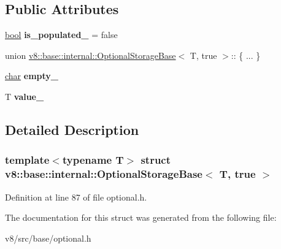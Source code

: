 \subsection*{Public Attributes}
\begin{DoxyCompactItemize}
\item 
\mbox{\label{structv8_1_1base_1_1internal_1_1OptionalStorageBase_3_01T_00_01true_01_4_a451d26301bf5afca988e47872e70180c}} 
\mbox{\hyperlink{classbool}{bool}} {\bfseries is\+\_\+populated\+\_\+} = false
\item 
\mbox{\label{structv8_1_1base_1_1internal_1_1OptionalStorageBase_3_01T_00_01true_01_4_a92e88dd2332f5bc0838d2665e460205b}} 
union \mbox{\hyperlink{structv8_1_1base_1_1internal_1_1OptionalStorageBase}{v8\+::base\+::internal\+::\+Optional\+Storage\+Base}}$<$ T, true $>$\+:: \{ ... \}  
\item 
\mbox{\label{structv8_1_1base_1_1internal_1_1OptionalStorageBase_3_01T_00_01true_01_4_a3a45e93590fd71b94b5c4e20f5f3f6d0}} 
\mbox{\hyperlink{classchar}{char}} {\bfseries empty\+\_\+}
\item 
\mbox{\label{structv8_1_1base_1_1internal_1_1OptionalStorageBase_3_01T_00_01true_01_4_a917c954d64e56f5683580c815d32a71c}} 
T {\bfseries value\+\_\+}
\end{DoxyCompactItemize}


\subsection{Detailed Description}
\subsubsection*{template$<$typename T$>$\newline
struct v8\+::base\+::internal\+::\+Optional\+Storage\+Base$<$ T, true $>$}



Definition at line 87 of file optional.\+h.



The documentation for this struct was generated from the following file\+:\begin{DoxyCompactItemize}
\item 
v8/src/base/optional.\+h\end{DoxyCompactItemize}
